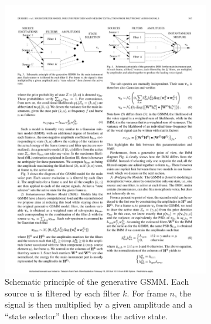 \begin{figure}[b]
        \centering
        \begin{subfigure}[b]{0.48\textwidth}
                \includegraphics[width=\textwidth]{Figures/gsmm}
                \caption{Schematic principle of the generative GSMM. Each source u is filtered by each filter $k$. For frame $n$, the signal is then multiplied by a  given amplitude and a ``state selector'' then chooses the active state.}
                \label{fig:gsmm}
        \end{subfigure}%
        \begin{subfigure}[b]{0.48\textwidth}

\end{subfigure}
\end{figure}
